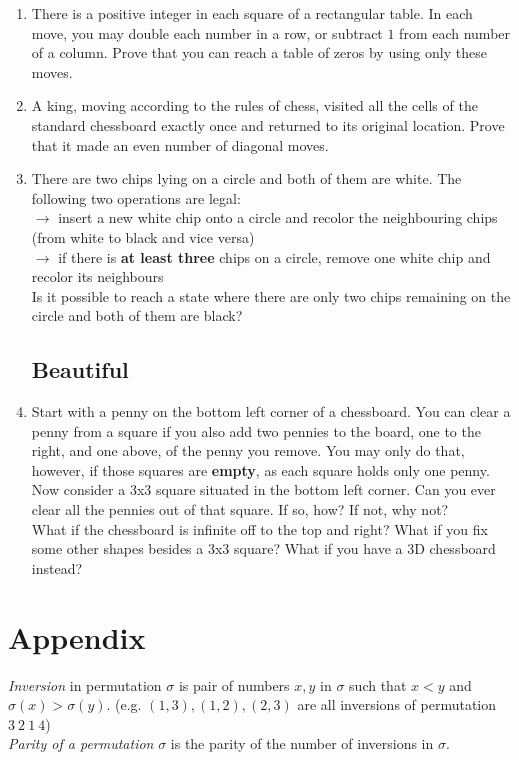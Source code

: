 \documentclass[11pt,a5paper]{article}
\begin{document}
\begin{enumerate}
	\item{There is a positive integer in each square of a rectangular table. In each move, you may double each number in a row, or subtract $1$ from each number of a column. Prove that you can reach a table of zeros by using only these moves.}
	
	\item{A king, moving according to the rules of chess, visited all the cells of the standard chessboard exactly once and returned to its original location. Prove that it made an even number of diagonal moves.}
	
	\item {
		There are two chips lying on a circle and both of them are white. 		The following two operations are legal:\\
		$\rightarrow$ insert a new white chip onto a circle and recolor the neighbouring chips (from white to black and vice versa)\\
		$\rightarrow$ if there is \textbf{at least three} chips on a circle, remove one white chip and recolor its neighbours\\
		Is it possible to reach a state where there are only two chips remaining on the circle and both of them are black? 
	}
	
	\subsection*{Beautiful}
	\item{Start with a penny on the bottom left corner of a chessboard.  You can clear a penny from a square if you also add two pennies to the board, one to the right, and one above, of the penny you remove.  You may only do that, however, if those squares are \textbf{empty}, as each square holds only one penny.\\
Now consider a 3x3 square situated in the bottom left corner.  Can you ever clear all the pennies out of that square.  If so, how?  If not, why not? \\
What if the chessboard is infinite off to the top and right?  What if you fix some other shapes besides a 3x3 square?  What if you have a 3D chessboard instead?}
\end{enumerate}

\pagebreak

\section{Appendix}
\emph{Inversion} in permutation $\sigma$ is pair of numbers $x, y$ in $\sigma$ such that $x < y$ and $\sigma(x) > \sigma(y)$. (e.g. $(1,3), (1,2), (2,3)$ are all inversions of permutation $3\ 2\ 1\ 4$)\\
\noindent\emph{Parity of a permutation} $\sigma$ is the parity of the number of inversions in $\sigma$.\\
\end{document}
